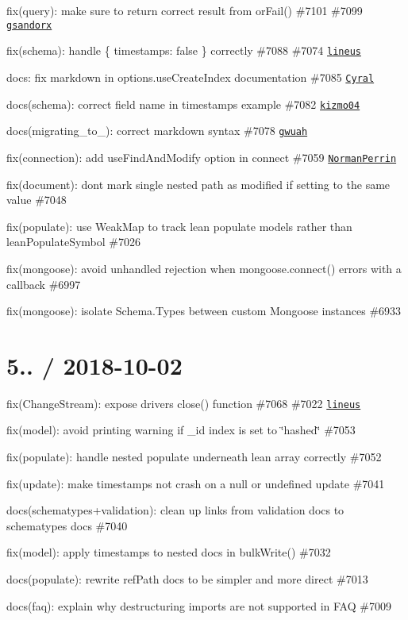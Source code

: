\begin{DoxyItemize}
\item fix(query)\+: make sure to return correct result from {\ttfamily or\+Fail()} \#7101 \#7099 \href{https://github.com/gsandorx}{\tt gsandorx}
\item fix(schema)\+: handle {\ttfamily \{ timestamps\+: false \}} correctly \#7088 \#7074 \href{https://github.com/lineus}{\tt lineus}
\item docs\+: fix markdown in options.\+use\+Create\+Index documentation \#7085 \href{https://github.com/Cyral}{\tt Cyral}
\item docs(schema)\+: correct field name in timestamps example \#7082 \href{https://github.com/kizmo04}{\tt kizmo04}
\item docs(migrating\+\_\+to\+\_)\+: correct markdown syntax \#7078 \href{https://github.com/gwuah}{\tt gwuah}
\item fix(connection)\+: add use\+Find\+And\+Modify option in connect \#7059 \href{https://github.com/NormanPerrin}{\tt Norman\+Perrin}
\item fix(document)\+: dont mark single nested path as modified if setting to the same value \#7048
\item fix(populate)\+: use Weak\+Map to track lean populate models rather than lean\+Populate\+Symbol \#7026
\item fix(mongoose)\+: avoid unhandled rejection when {\ttfamily mongoose.\+connect()} errors with a callback \#6997
\item fix(mongoose)\+: isolate Schema.\+Types between custom Mongoose instances \#6933
\end{DoxyItemize}

\section*{5.. / 2018-\/10-\/02 }


\begin{DoxyItemize}
\item fix(\+Change\+Stream)\+: expose driver\textquotesingle{}s {\ttfamily close()} function \#7068 \#7022 \href{https://github.com/lineus}{\tt lineus}
\item fix(model)\+: avoid printing warning if {\ttfamily \+\_\+id} index is set to \char`\"{}hashed\char`\"{} \#7053
\item fix(populate)\+: handle nested populate underneath lean array correctly \#7052
\item fix(update)\+: make timestamps not crash on a null or undefined update \#7041
\item docs(schematypes+validation)\+: clean up links from validation docs to schematypes docs \#7040
\item fix(model)\+: apply timestamps to nested docs in bulk\+Write() \#7032
\item docs(populate)\+: rewrite ref\+Path docs to be simpler and more direct \#7013
\item docs(faq)\+: explain why destructuring imports are not supported in F\+AQ \#7009
\end{DoxyItemize}

